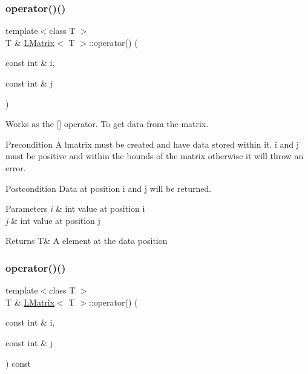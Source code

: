 \subsubsection{\texorpdfstring{operator()()}{operator()()}\hspace{0.1cm}{\footnotesize\ttfamily [1/2]}}
{\footnotesize\ttfamily template$<$class T $>$ \\
T \& \mbox{\hyperlink{class_l_matrix}{L\+Matrix}}$<$ T $>$\+::operator() (\begin{DoxyParamCaption}\item[{const int \&}]{i,  }\item[{const int \&}]{j }\end{DoxyParamCaption})}



Works as the \mbox{[}\mbox{]} operator. To get data from the matrix. 

\begin{DoxyPrecond}{Precondition}
A lmatrix must be created and have data stored within it. i and j must be positive and within the bounds of the matrix otherwise it will throw an error. 
\end{DoxyPrecond}
\begin{DoxyPostcond}{Postcondition}
Data at position i and j will be returned.
\end{DoxyPostcond}

\begin{DoxyParams}{Parameters}
{\em i} & int value at position i \\
\hline
{\em j} & int value at position j \\
\hline
\end{DoxyParams}
\begin{DoxyReturn}{Returns}
T\& A element at the data position 
\end{DoxyReturn}
\mbox{\label{class_l_matrix_ae9d404d99117892edd2fbfddfaf929f5}} 
\subsubsection{\texorpdfstring{operator()()}{operator()()}\hspace{0.1cm}{\footnotesize\ttfamily [2/2]}}
{\footnotesize\ttfamily template$<$class T $>$ \\
T \& \mbox{\hyperlink{class_l_matrix}{L\+Matrix}}$<$ T $>$\+::operator() (\begin{DoxyParamCaption}\item[{const int \&}]{i,  }\item[{const int \&}]{j }\end{DoxyParamCaption}) const}



